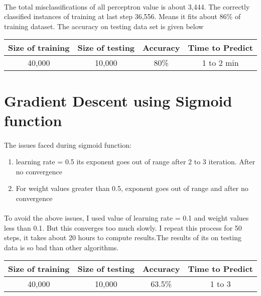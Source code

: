 \documentclass[]{report}
\begin{document}
\paragraph{} The total misclassifications of all perceptron value is about 3,444. The correctly classified instances of training at last step 36,556. Means it fits about 86\% of training dataset. The accuracy on testing data set is given below
\begin{center}
	\begin{tabular}{||c c c c||} 
		\hline
		Size of training & Size of testing & Accuracy&Time to Predict\\ [0.5ex] 
		\hline\hline
		40,000 & 10,000 & 80\% & 1 to 2 min \\ 
		[1ex] 
		\hline
	\end{tabular}
\end{center}
\section{Gradient Descent using Sigmoid function}
\paragraph{} The issues faced during sigmoid function:
\begin{enumerate}
	\item learning rate = 0.5 its exponent goes out of range after 2 to 3 iteration. After no convergence
	\item For weight values greater than 0.5, exponent goes out of range and after no convergence
\end{enumerate}
\paragraph{} To avoid the above issues, I used value of learning rate = 0.1 and weight values less than 0.1. But this converges too much slowly. I repeat this process for 50 steps, it takes about 20 hours to compute results.The results of its on testing data is so bad than other algorithms.
\begin{center}
	\begin{tabular}{||c c c c||} 
		\hline
		Size of training & Size of testing & Accuracy&Time to Predict\\ [0.5ex] 
		\hline\hline
		40,000 & 10,000 & 63.5\% & 1 to 3 \\ 
		[1ex] 
		\hline
	\end{tabular}
\end{center}
\end{document}
